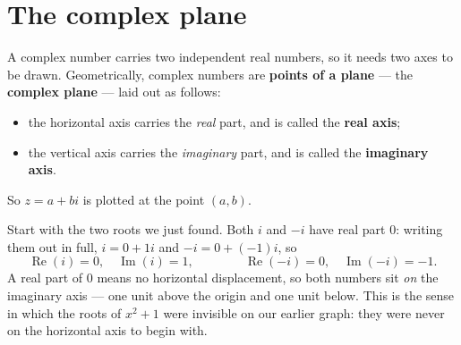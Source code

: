 \documentclass[11pt]{article}
\theoremstyle{definition}
\theoremstyle{remark}
\newcommand{\Rez}{\operatorname{Re}}
\newcommand{\Imz}{\operatorname{Im}}
\newcommand{\cplane}[4]{%
  \draw[step=1cm,gray!25,very thin] (#1,#3) grid (#2,#4);
  \draw[axisline] (#1,0) -- (#2+0.55,0)
        node[right,font=\scriptsize,black]{$\Rez$};
  \draw[axisline] (0,#3) -- (0,#4+0.55)
        node[above,font=\scriptsize,black]{$\Imz$};
}
\newcommand{\cpoint}[5]{%
  \fill[#3] (#1,#2) circle (2.1pt);
  \node[#5,font=\scriptsize,#3] at (#1,#2) {#4};
}
\begin{document}
\section{The complex plane}
A complex number carries two independent real numbers, so it needs two axes to
be drawn. Geometrically, complex numbers are \textbf{points of a plane} --- the
\textbf{complex plane} --- laid out as follows:

\begin{itemize}[leftmargin=1.4em,itemsep=2pt]
  \item the horizontal axis carries the \emph{real} part, and is called the
        \textbf{real axis};
  \item the vertical axis carries the \emph{imaginary} part, and is called the
        \textbf{imaginary axis}.
\end{itemize}

\noindent So $z=a+bi$ is plotted at the point $(a,b)$.

Start with the two roots we just found. Both $i$ and $-i$ have real part $0$:
writing them out in full, $i=0+1i$ and $-i=0+(-1)i$, so
\[
  \Rez(i)=0,\quad \Imz(i)=1,
  \qquad\qquad
  \Rez(-i)=0,\quad \Imz(-i)=-1 .
\]
A real part of $0$ means no horizontal displacement, so both numbers sit
\emph{on} the imaginary axis --- one unit above the origin and one unit below.
This is the sense in which the roots of $x^{2}+1$ were invisible on our earlier
graph: they were never on the horizontal axis to begin with.

\begin{center}
\hspace{1.0cm}
\end{center}
\end{document}
